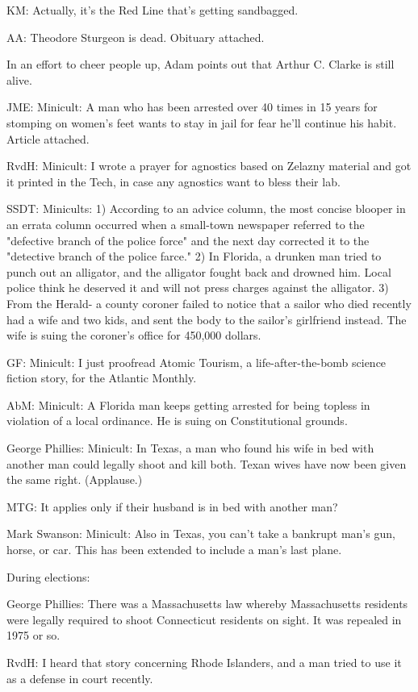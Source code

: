 \documentclass[12pt]{article}
\begin{document}
KM: Actually, it's the Red Line that's getting sandbagged.

AA: Theodore Sturgeon is dead. Obituary attached.

In an effort to cheer people up, Adam points out that Arthur C. Clarke is still alive.

JME: Minicult: A man who has been arrested over 40 times in 15 years for stomping on women's feet wants to stay in jail for fear he'll continue his habit. Article attached.

RvdH: Minicult: I wrote a prayer for agnostics based on Zelazny material and got it printed in the Tech, in case any agnostics want to bless their lab.

SSDT: Minicults: 1) According to an advice column, the most concise blooper in an errata column occurred when a small-town newspaper referred to the "defective branch of the police force" and the next day corrected it to the "detective branch of the police farce." 2) In Florida, a drunken man tried to punch out an alligator, and the alligator fought back and drowned him. Local police think he deserved it and will not press charges against the alligator. 3) From the Herald- a county coroner failed to notice that a sailor who died recently had a wife and two kids, and sent the body to the sailor's girlfriend instead. The wife is suing the coroner's office for 450,000 dollars.

GF: Minicult: I just proofread Atomic Tourism, a life-after-the-bomb science fiction story, for the Atlantic Monthly.

AbM: Minicult: A Florida man keeps getting arrested for being topless in violation of a local ordinance. He is suing on Constitutional grounds.

George Phillies: Minicult: In Texas, a man who found his wife in bed with another man could legally shoot and kill both. Texan wives have now been given the same right. (Applause.)

MTG: It applies only if their husband is in bed with another man?

Mark Swanson: Minicult: Also in Texas, you can't take a bankrupt man's gun, horse, or car. This has been extended to include a man's last plane.

During elections:

George Phillies: There was a Massachusetts law whereby Massachusetts residents were legally required to shoot Connecticut residents on sight. It was repealed in 1975 or so.

RvdH: I heard that story concerning Rhode Islanders, and a man tried to use it as a defense in court recently.
\end{document}
